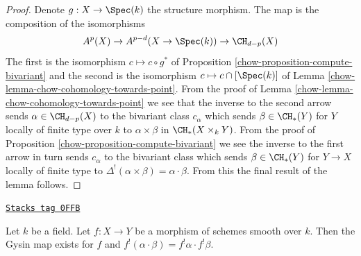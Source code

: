 \begin{proof}

Denote $g : X \to \Spec(k)$ the structure morphism.
The map is the composition of the isomorphisms
$$
A^p(X) \to A^{p - d}(X \to \Spec(k)) \to \CH_{d - p}(X)
$$
The first is the isomorphism $c \mapsto c \circ g^*$ of
Proposition \ref{chow-proposition-compute-bivariant}
and the second is the isomorphism $c \mapsto c \cap [\Spec(k)]$ of
Lemma \ref{chow-lemma-chow-cohomology-towards-point}.
From the proof of Lemma \ref{chow-lemma-chow-cohomology-towards-point}
we see that the inverse to the second arrow sends $\alpha \in \CH_{d - p}(X)$
to the bivariant class $c_\alpha$ which sends $\beta \in \CH_*(Y)$
for $Y$ locally of finite type over $k$
to $\alpha \times \beta$ in $\CH_*(X \times_k Y)$. From the proof of
Proposition \ref{chow-proposition-compute-bivariant} we see the inverse
to the first arrow in turn sends $c_\alpha$ to the bivariant class
which sends $\beta \in \CH_*(Y)$ for $Y \to X$ locally of finite type
to $\Delta^!(\alpha \times \beta) = \alpha \cdot \beta$.
From this the final result of the lemma follows.
\end{proof}

\begin{lemma}
\label{chow-lemma-lci-gysin-product}
\href{https://stacks.math.columbia.edu/tag/0FFB}{\texttt{Stacks tag 0FFB}}

Let $k$ be a field. Let $f : X \to Y$ be a morphism of schemes smooth
over $k$. Then the Gysin map exists for $f$ and
$f^!(\alpha \cdot \beta) = f^!\alpha \cdot f^!\beta$.
\end{lemma}

